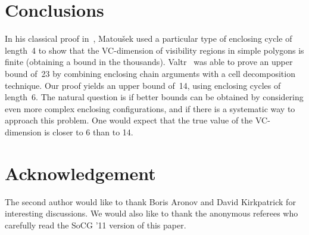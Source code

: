 \documentclass[11pt]{article}
\begin{document}
\section{Conclusions}      \label{conclu-sec}                                           

In his classical proof in~\cite{m-ldg-02}, Matou\v sek used
a particular type of enclosing cycle of length~4 to show that the VC-dimension of visibility
regions in simple polygons is finite (obtaining a bound in the thousands). Valtr~\cite{v-ggwps-98}
was able to prove an upper bound of~23 by combining enclosing chain arguments with a
cell decomposition technique. Our proof yields an upper bound of~14, using enclosing
cycles of length~6. The natural question is if better bounds can be obtained by considering
even more complex enclosing configurations, and if there is a systematic way to approach
this problem. One would expect that the true value of the VC-dimension is
closer to 6 than to 14.




\section{Acknowledgement}
The second author would like to thank Boris Aronov and David Kirkpatrick for interesting discussions. We would also like to thank the anonymous referees who carefully read the SoCG '11 version of this paper.

\bigskip

{}

\end{document}
